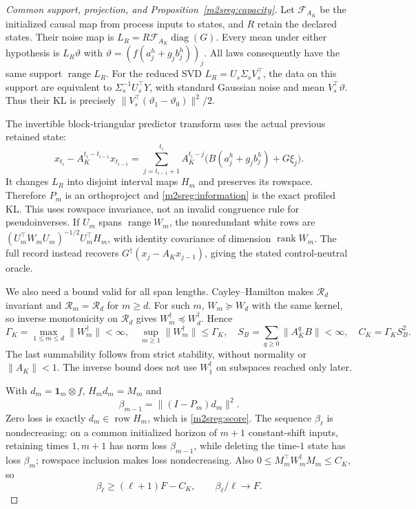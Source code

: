 \begin{proof}[Common support, projection, and Proposition~\ref{m2sreg:capacity}]
Let $\mathcal F_{A_K}$ be the initialized causal map from process
inputs to states, and $R$ retain the declared states. Their noise map is
$L_R=R\mathcal F_{A_K}\operatorname{diag}(G)$.
Every mean under either hypothesis is $L_R\vartheta$ with
$\vartheta=(f(a_j^h+g_jb_j^h))_j$. All laws consequently have the
same support $\operatorname{range}L_R$.
For the reduced SVD $L_R=U_s\Sigma_sV_s^\top$, the data on this support
are equivalent to $\Sigma_s^{-1}U_s^\top Y$, with standard Gaussian
noise and mean $V_s^\top\vartheta$. Thus their KL is precisely
$\|V_s^\top(\vartheta_1-\vartheta_0)\|^2/2$.

The invertible block-triangular predictor transform uses the actual
previous retained state:
\[
x_{t_i}-A_K^{t_i-t_{i-1}}x_{t_{i-1}}
=\sum_{j=t_{i-1}+1}^{t_i}A_K^{t_i-j}
 \bigl(B(a_j^h+g_jb_j^h)+G\xi_j\bigr).
\]
It changes $L_R$ into disjoint interval maps $H_m$ and preserves its
rowspace. Therefore $P_m$ is an orthoproject and
\eqref{m2sreg:information} is the exact profiled KL.
This uses rowspace invariance, not an invalid congruence rule for
pseudoinverses. If $U_m$ spans $\operatorname{range}W_m$, the
nonredundant white rows are
$(U_m^\top W_mU_m)^{-1/2}U_m^\top H_m$, with identity covariance
of dimension $\operatorname{rank}W_m$.
The full record instead recovers
$G^\dagger(x_j-A_Kx_{j-1})$, giving the stated control-neutral oracle.

We also need a bound valid for all span lengths.
Cayley--Hamilton makes $\mathcal R_d$ invariant and
$\mathcal R_m=\mathcal R_d$ for $m\ge d$.
For such $m$, $W_m\succeq W_d$ with the same kernel, so inverse
monotonicity on $\mathcal R_d$ gives $W_m^\dagger\preceq W_d^\dagger$.
Hence
\begin{equation}\label{m2sreg:gamma}
\Gamma_K=\max_{1\le m\le d}\|W_m^\dagger\|<\infty,\quad
\sup_{m\ge1}\|W_m^\dagger\|\le\Gamma_K,\quad
S_B=\sum_{q\ge0}\|A_K^qB\|<\infty,\quad C_K=\Gamma_KS_B^2 .
\end{equation}
The last summability follows from strict stability, without normality
or $\|A_K\|<1$. The inverse bound does not use $W_1^\dagger$ on
subspaces reached only later.

With $d_m=\mathbf1_m\otimes f$, $H_md_m=M_m$ and
\[
\beta_{m-1}=\|(I-P_m)d_m\|^2.
\]
Zero loss is exactly $d_m\in\operatorname{row}H_m$, which is
\eqref{m2sreg:score}.
The sequence $\beta_\ell$ is nondecreasing: on a common initialized
horizon of $m+1$ constant-shift inputs, retaining times $1,m+1$
has norm loss $\beta_{m-1}$, while deleting the time-$1$ state has
loss $\beta_m$; rowspace inclusion makes loss nondecreasing.
Also $0\le M_m^\top W_m^\dagger M_m\le C_K$, so
\begin{equation}\label{m2sreg:tail}
\beta_\ell\ge(\ell+1)F-C_K,\qquad \beta_\ell/\ell\longrightarrow F.
\end{equation}


\end{proof}
